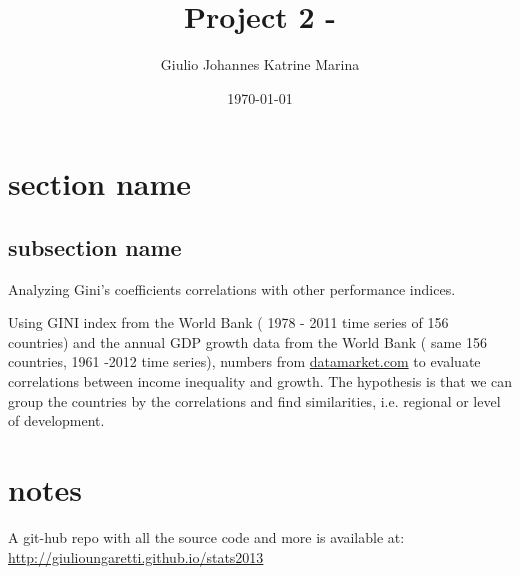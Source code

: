 \documentclass[twocolumn]{article}
\begin{document}
	\title{Project 2 - }
	\author{Giulio  Johannes Katrine Marina}
	\date{\today}

\clearpage

\section{section name} %
\label{sec:section_name}
	\subsection{subsection name} %
	\label{sub:subsection_name}
	
Analyzing Gini's coefficients correlations with other performance indices.

Using GINI index from the World Bank ( 1978 - 2011 time series of 156 countries) and the annual GDP growth data from the World Bank ( same 156 countries, 1961 -2012 time series), numbers from \url{datamarket.com} to evaluate correlations between income inequality and growth. The hypothesis is that we can group the countries by the correlations and find similarities, i.e. regional or level of development.

\clearpage
\section{notes}



	A git-hub repo with all the source code and more is available at:
	\url{http://giulioungaretti.github.io/stats2013}
\end{document}
